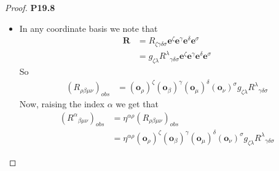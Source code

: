 \documentclass[11pt]{article}
\theoremstyle{definition}
\begin{document}
\cleardoublepage
\begin{proof}{\textbf{P19.8}}\\
\begin{itemize}
\item [\textbf{a.}]
In any coordinate basis we note that
\begin{align*}
    \bm{R}
    &= R_{\zeta\gamma\delta\sigma}\bm{e}^\zeta\bm{e}^\gamma\bm{e}^\delta\bm{e}^\sigma \\
    &= g_{\zeta\lambda}{R^\lambda}_{\gamma\delta\sigma}\bm{e}^\zeta\bm{e}^\gamma\bm{e}^\delta\bm{e}^\sigma 
\end{align*}
So
\begin{align*}
    (R_{\rho\beta\mu\nu})_{obs}
    &= (\bm{o}_\rho)^\zeta (\bm{o}_\beta)^\gamma (\bm{o}_\mu)^\delta (\bm{o}_\nu)^\sigma
    g_{\zeta\lambda}{R^\lambda}_{\gamma\delta\sigma} 
\end{align*}
Now, raising the index $\alpha$ we get that
\begin{align*}
    ({R^\alpha}_{\beta\mu\nu})_{obs}
    &= \eta^{\alpha\rho}(R_{\rho\beta\mu\nu})_{obs}\\
    &= \eta^{\alpha\rho}
    (\bm{o}_\rho)^\zeta (\bm{o}_\beta)^\gamma (\bm{o}_\mu)^\delta (\bm{o}_\nu)^\sigma
    g_{\zeta\lambda}{R^\lambda}_{\gamma\delta\sigma} 
\end{align*}


\end{itemize}
\end{proof}
\end{document}
